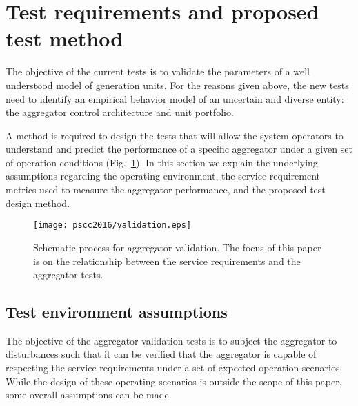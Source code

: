 \section{Test requirements and proposed test  method}\label{sec:metrics}

The objective of the current tests is to validate the parameters of a well understood model of generation units. For the reasons given above, the new tests need to identify an empirical behavior model of an uncertain and diverse entity: the aggregator control architecture and unit portfolio. 

A method is required to design the tests that will allow the system operators to understand and predict the performance of a specific aggregator under a given set of operation conditions (Fig.~\ref{fig:framework}). In this section we explain the underlying assumptions regarding the operating environment, the service requirement metrics used to measure the aggregator performance, and the proposed test design method.

\begin{figure}[!t]
\centering
\texttt{[image: pscc2016/validation.eps]}
\caption{Schematic process for aggregator validation. The focus of this paper is on the relationship between the service requirements and the aggregator tests.}
\label{fig:framework}
\end{figure}




\subsection{Test environment assumptions}
The objective of the aggregator validation tests is to subject the aggregator to disturbances such that it can be verified that the aggregator is capable of respecting the service requirements under a set of expected operation scenarios. While the design of these operating scenarios is outside the scope of this paper, some overall assumptions can be made.

